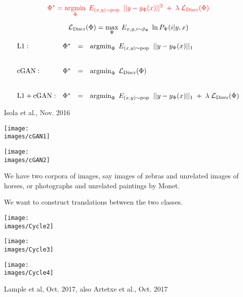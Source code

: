 {

$${\color{red} \Phi^* = \operatorname*{argmin}_\Phi\;E_{(x,y) \sim \mathrm{pop}}\;\; ||y- y_\Phi(x)||^2\; + \; \lambda\; {\cal L}_{\mathrm{Discr}}(\Phi)}$$

\vfill
$${\cal L}_\mathrm{Discr}(\Phi) = \max_\Psi \;E_{x,y,i \sim \tilde{p}_\Phi}\; \ln P_\Psi(i|y,x)$$


{\huge
$$\begin{array}{lrcl}
\mathrm{L1:} & \Phi^* & = & \operatorname*{argmin}_\Phi\;E_{(x,y) \sim \mathrm{pop}}\;\; ||y - y_\Phi(x)||_1 \\
\\
\\
\mathrm{cGAN:} & \Phi^* & = & \operatorname*{argmin}_\Phi\;{\cal L}_{\mathrm{Discr}}(\Phi) \\
\\
\\
\mathrm{L1 + cGAN:} & \Phi^* & = & \operatorname*{argmin}_\Phi\;E_{(x,y) \sim \mathrm{pop}}\;\; ||y - y_\Phi(x)||_1\; +\; \lambda\; {\cal L}_\mathrm{Discr}(\Phi)
\end{array}$$
}


{Isola et al., Nov. 2016}

\centerline{\texttt{[image: \\images/cGAN1]}}


\centerline{\texttt{[image: \\images/cGAN2]}}


We have two corpora of images, say images of zebras and unrelated images of horses, or photographs and unrelated paintings by Monet.

\vfill
We want to construct translations between the two classes.

\centerline{\texttt{[image: \\images/Cycle2]}}


\centerline{\texttt{[image: \\images/Cycle3]}}


\centerline{\texttt{[image: \\images/Cycle4]}}

         {Lample et al, Oct. 2017, also Artetxe et al., Oct. 2017}


}
